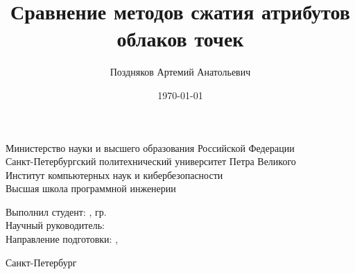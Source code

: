 \documentclass[aspectratio=169]{beamer}
\title{Сравнение методов сжатия атрибутов облаков точек}
\date{\today}
\author{Поздняков Артемий Анатольевич}
\institute{Высшая школа программной инженерии}
\begin{document}
  

  \begin{frame}

    \begin{center}
      \begin{scriptsize}
        Министерство науки и высшего образования Российской Федерации\\
        Санкт-Петербургский политехнический университет Петра Великого\\
        Институт компьютерных наук и кибербезопасности\\
        Высшая школа программной инженерии\\[5\baselineskip]
      \end{scriptsize}

      \Large\textbf{\Theme{}}
    \end{center}

    \begin{flushright}
      \begin{scriptsize}
        Выполнил студент: \textbf{\AuthorFull{}}, гр. \Group{}\\
        Научный руководитель: \SupervisorPosition{} \textbf{\SupervisorFull{}}\\
        Направление подготовки: \ProfileCode{}, \textbf{\ProfileName{}}\\
      \end{scriptsize}
    \end{flushright}

    \mbox{}\vfill

    \begin{center}
      \begin{scriptsize}
        Санкт-Петербург\\
        \vspace{-0.6\baselineskip}
        \the\year{}
      \end{scriptsize}
    \end{center}


  \end{frame}
\end{document}
